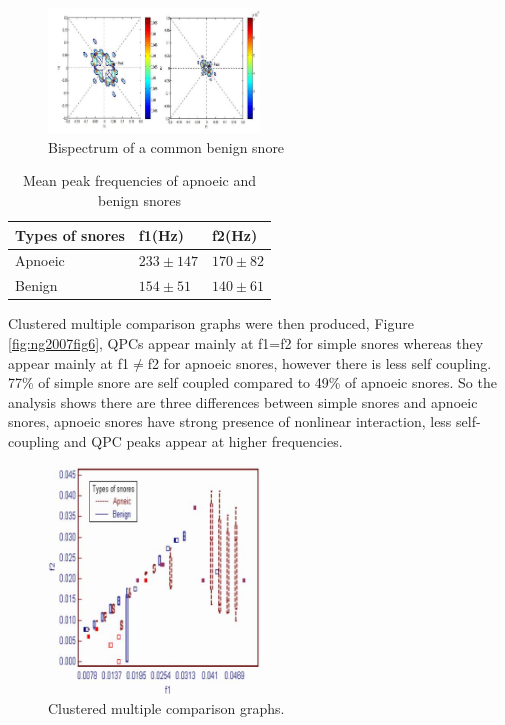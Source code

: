 \begin{figure}[h]
\centering 
\includegraphics[width=0.5\textwidth]{drawings/ng2007fig45}
\caption{Bispectrum of a common benign snore ~\cite{ng2007bispectral}}
\label{fig: ng2007fig45 }
\end{figure}
\begin{table}[h]
\centering
\begin{tabular}{@{}lll@{}}
\toprule
Types of snores&f1(Hz)&f2(Hz)\\\midrule
Apnoeic& $233 \pm 147$ &$170 \pm 82$\\
Benign& $154 \pm 51$& $140 \pm 61$\\\bottomrule
\end{tabular}
\caption{Mean peak frequencies of apnoeic and benign snores}
\label{table:ng2007bispectral}
\end{table}
Clustered multiple comparison graphs were then produced, Figure \ref{fig:ng2007fig6}, QPCs appear mainly at f1=f2 for simple snores whereas they appear mainly at f1$\neq$f2 for apnoeic snores, however there is less self coupling. 77\% of simple snore are self coupled compared to 49\% of apnoeic snores. So the analysis shows there are three differences between simple snores and apnoeic snores, apnoeic snores have strong presence of nonlinear interaction, less self-coupling and QPC peaks appear at higher frequencies. 

\begin{figure}[h]
\centering 
\includegraphics[width=0.5\textwidth]{drawings/ng2007fig6}
\caption{Clustered multiple comparison graphs. ~\cite{ng2007bispectral}}
\label{fig: ng2007fig6 }
\end{figure}

